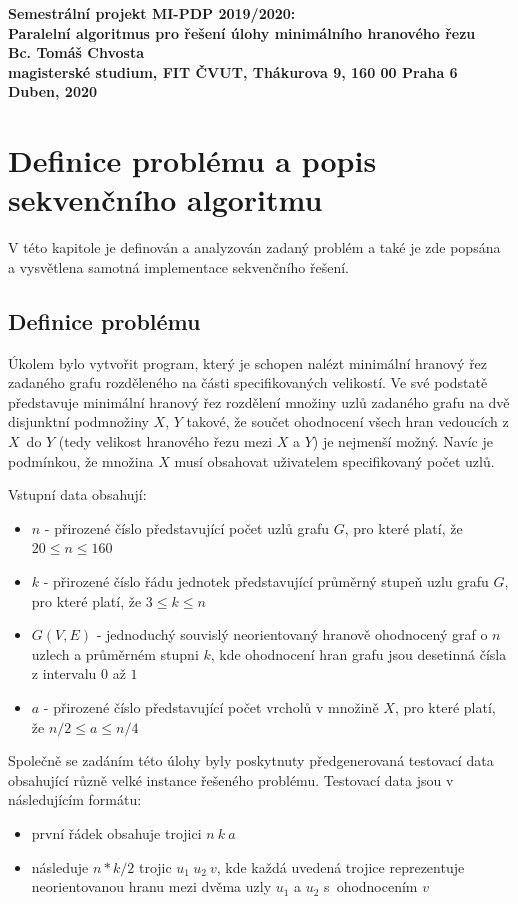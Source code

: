 \documentclass{article}
\begin{document}
\begin{center}
\bf Semestrální projekt MI-PDP 2019/2020:\\[5mm]
    Paralelní algoritmus pro řešení úlohy minimálního hranového řezu\\[5mm] 
       Bc. Tomáš Chvosta\\[2mm]
magisterské studium, FIT ČVUT, Thákurova 9, 160 00 Praha 6\\[2mm]
Duben, 2020
\end{center}

\section{Definice problému a popis sekvenčního algoritmu}
V této kapitole je definován a analyzován zadaný problém a také je zde popsána a vysvětlena samotná implementace sekvenčního řešení.
\subsection{Definice problému}
Úkolem bylo vytvořit program, který je schopen nalézt minimální hranový řez zadaného grafu rozděleného na části specifikovaných velikostí. Ve své podstatě představuje minimální hranový řez rozdělení množiny uzlů zadaného grafu na dvě disjunktní podmnožiny $X$, $Y$ takové, že součet ohodnocení všech hran vedoucích z $X$~do $Y$ (tedy velikost hranového řezu mezi $X$ a $Y$) je nejmenší možný. Navíc je podmínkou, že množina $X$ musí obsahovat uživatelem specifikovaný počet uzlů.

Vstupní data obsahují:
\begin{itemize}
	\item $n$ - přirozené číslo představující počet uzlů grafu $G$, pro které platí, že $20 \leq n \leq 160$
	
	\item $k$ - přirozené číslo řádu jednotek představující průměrný stupeň uzlu grafu $G$, pro které platí, že $3 \leq k \leq n$
	
	\item $G(V,E)$ - jednoduchý souvislý neorientovaný hranově ohodnocený graf o $n$ uzlech a průměrném stupni $k$, kde ohodnocení hran grafu jsou desetinná čísla z intervalu $0$ až $1$
	
	\item $a$ - přirozené číslo představující počet vrcholů v množině $X$, pro které platí, že $n/2 \leq a \leq n/4$
\end{itemize}
Společně se zadáním této úlohy byly poskytnuty předgenerovaná testovací data obsahující různě velké instance řešeného problému. Testovací data jsou v následujícím formátu:  
\begin{itemize}
	\item první řádek obsahuje trojici $n\ k\ a$
	\item následuje $n * k/2$ trojic $u_1\ u_2\ v$, kde každá uvedená trojice reprezentuje neorientovanou hranu mezi dvěma uzly $u_1$ a $u_2$ s~ohodnocením $v$
\end{itemize}
\end{document}
